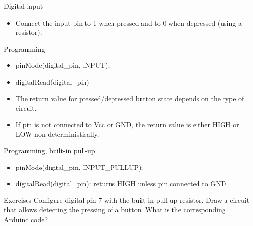 \documentclass[aspectratio=1610]{beamer}
\begin{document}

\begin{frame}[t,plain]{Digital input}
\begin{itemize}
\item Connect the input pin to 1 when pressed and to 0 when depressed
  (using a resistor).
\end{itemize}
\end{frame}


\begin{frame}[t,plain]{Programming}
\begin{itemize}
\item pinMode(digital\_pin, INPUT);

\item digitalRead(digital\_pin)

\bigskip
\item The return value for pressed/depressed button state depends on
  the type of circuit.

\bigskip
\item If pin is not connected to Vcc or GND, the return value is
  either HIGH or LOW non-deterministically.
\end{itemize}
\end{frame}



\begin{frame}[t,plain]{Programming, built-in pull-up}
\begin{itemize}
\item pinMode(digital\_pin, INPUT\_PULLUP);

\item digitalRead(digital\_pin): returns HIGH unless pin connected to GND.
\end{itemize}
\end{frame}



\begin{frame}[t,plain]{Exercises}
Configure digital pin 7 with the built-in pull-up resistor. Draw a
circuit that allows detecting the pressing of a button. What is the
corresponding Arduino code?
\end{frame}
\end{document}
